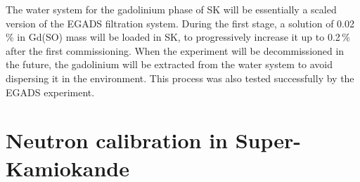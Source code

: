 The water system for the gadolinium phase of SK will be essentially a scaled version of the EGADS filtration system.
During the first stage, a solution of 0.02\,\% in Gd(SO) mass will be loaded in SK, %
to progressively increase it up to 0.2\,\% after the first commissioning.
When the experiment will be decommissioned in the future, the gadolinium will be extracted from the water system %
to avoid dispersing it in the environment.
This process was also tested successfully by the EGADS experiment.


\section{Neutron calibration in Super-Kamiokande}
\label{sec:neutron_cal}



